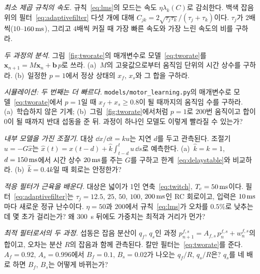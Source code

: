 \begin{exercise}[\lvlB]
\label{ex:15:2}
\emph{최소 제곱 규칙의 속도.} 규칙~\eqref{eq:lms}의 모드는 속도 $\eta\lambda_k(C)$로 감쇠한다. 백색 잡음 위의 필터~\eqref{eq:adaptivefilter} 다섯 개에 대해 $C_{jk}=2\sqrt{\tau_j\tau_k}/(\tau_j+\tau_k)$이다. $\tau_j$가 $2$배씩($10$--$160\,\text{ms}$), 그리고 $4$배씩 커질 때 가장 빠른 속도와 가장 느린 속도의 비를 구하라.
\end{exercise}

\begin{exercise}[\lvlB]
\label{ex:15:3}
\emph{두 과정의 분석.} 그림~\ref{fig:tworate}의 매개변수로 모델~\eqref{eq:tworate}를 $\mathbf x_{n+1}=M\mathbf x_n+\mathbf b\,p$로 쓰라. (a)~$M$의 고윳값으로부터 움직임 단위의 시간 상수를 구하라. (b)~일정한 $p=1$에서 정상 상태의 $x_f$, $x_s$와 그 합을 구하라.
\end{exercise}

\begin{exercise}[\lvlB]
\label{ex:15:4}
\emph{시뮬레이션: 두 번째는 더 빠르다.} \texttt{models/\allowbreak motor\_learning.py}의 매개변수로 모델~\eqref{eq:tworate}에서 $p=1$일 때 $x_f+x_s\ge0.8$이 될 때까지의 움직임 수를 구하라. (a)~학습하지 않은 기계; (b)~그림~\ref{fig:tworate}에서처럼 $p=1$로 $200$번 움직이고 합이 0이 될 때까지 반대 섭동을 준 뒤. 과정이 하나인 모델도 이렇게 빨라질 수 있는가?
\end{exercise}

\begin{exercise}[\lvlB]
\label{ex:15:5}
\emph{내부 모델을 가진 조절기.} 대상 $\dd x/\dd t=ku$는 지연 $d$를 두고 관측된다. 조절기 $u=-G\hat x$는 $\hat x(t)=x(t-d)+\hat k\int_{t-d}^{t}u\,\dd s$로 예측한다. (a)~$\hat k=k=1$, $d=150\,\text{ms}$에서 시간 상수 $20\,\text{ms}$를 주는 $G$를 구하고 한계~\eqref{eq:delaystable}와 비교하라. (b)~$\hat k=0.4k$일 때 회로는 안정한가?
\end{exercise}

\begin{exercise}[\lvlB]
\label{ex:15:6}
\emph{적응 필터가 근육을 배운다.} 대상은 넓이가 1인 연축~\eqref{eq:twitch}, $T_c=50\,\text{ms}$이다. 필터~\eqref{eq:adaptivefilter}는 $\tau_j=12.5$, $25$, $50$, $100$, $200\,\text{ms}$인 RC 회로이고, 입력은 $10\,\text{ms}$마다 새로운 정규 난수이다. $\eta=50$과 $200$에서 규칙~\eqref{eq:lms}가 오차를 $0.5\%$로 낮추는 데 몇 초가 걸리는가? 왜 $300$~s 뒤에도 가중치는 최적과 거리가 먼가?
\end{exercise}

\begin{exercise}[\lvlC]
\label{ex:15:7}
\emph{최적 필터로서의 두 과정.} 섭동은 잡음 분산이 $q_f$, $q_s$인 과정 $p^{f,s}_{n+1}=A_{f,s}\,p^{f,s}_n+w^{f,s}_n$의 합이고, 오차는 분산 $R$의 잡음과 함께 관측된다. 칼만 필터는~\eqref{eq:tworate}를 준다. $A_f=0.92$, $A_s=0.996$에서 $B_f=0.1$, $B_s=0.02$가 나오는 $q_f/R$, $q_s/R$은? $q_s$를 네 배로 하면 $B_f$, $B_s$는 어떻게 바뀌는가?
\end{exercise}
